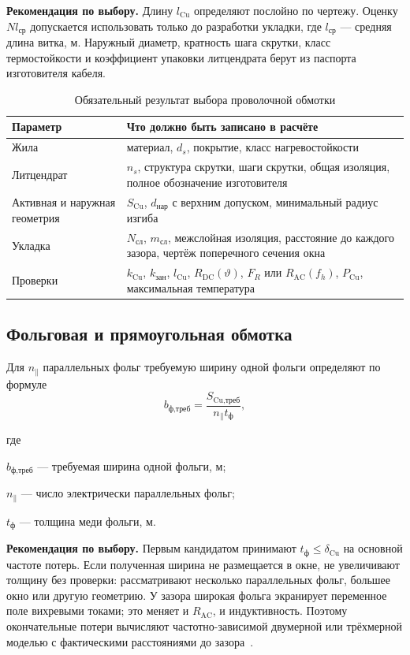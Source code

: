 \documentclass[14pt,a4paper]{extarticle}
\newcommand{\recommend}{\par\noindent\textbf{Рекомендация по выбору.} }
\newenvironment{whereblock}
 {\par\noindent где\par
  \begin{list}{}{\setlength{\leftmargin}{12.5mm}
                  \setlength{\itemindent}{-12.5mm}
                  \setlength{\itemsep}{0pt}
                  \setlength{\parsep}{0pt}
                  \setlength{\topsep}{0pt}}}
 {\end{list}}
\newcommand{\whereitem}[2]{\item[] #1 --- #2}
\begin{document}
\recommend Длину $l_{\text{Cu}}$ определяют послойно по чертежу.
Оценку $N l_{\text{ср}}$ допускается использовать только до разработки
укладки, где $l_{\text{ср}}$ --- средняя длина витка, м. Наружный диаметр,
кратность шага скрутки, класс термостойкости и коэффициент упаковки
литцендрата берут из паспорта изготовителя кабеля.

\begin{table}[H]
\caption{Обязательный результат выбора проволочной обмотки}
\label{tab:winding-selection-result}
\centering
\small
\begin{tabularx}{\textwidth}{>{\raggedright\arraybackslash}p{53mm} X}
\toprule
Параметр & Что должно быть записано в расчёте \\
\midrule
Жила & материал, $d_s$, покрытие, класс нагревостойкости \\
Литцендрат & $n_s$, структура скрутки, шаги скрутки, общая изоляция,
полное обозначение изготовителя \\
Активная и наружная геометрия & $S_{\text{Cu}}$, $d_{\text{нар}}$ с
верхним допуском, минимальный радиус изгиба \\
Укладка & $N_{\text{сл}}$, $m_{\text{сл}}$, межслойная изоляция, расстояние
до каждого зазора, чертёж поперечного сечения окна \\
Проверки & $k_{\text{Cu}}$, $k_{\text{зан}}$, $l_{\text{Cu}}$,
$R_{\text{DC}}(\vartheta)$, $F_R$ или $R_{\text{AC}}(f_h)$,
$P_{\text{Cu}}$, максимальная температура \\
\bottomrule
\end{tabularx}
\end{table}

\subsection{Фольговая и прямоугольная обмотка}

Для $n_{\parallel}$ параллельных фольг требуемую ширину одной фольги
определяют по формуле
\begin{equation}
 b_{\text{ф,треб}}=
 \frac{S_{\text{Cu,треб}}}
 {n_{\parallel}t_{\text{ф}}},
 \label{eq:foil-width}
\end{equation}
\begin{whereblock}
\whereitem{$b_{\text{ф,треб}}$}{требуемая ширина одной фольги, м;}
\whereitem{$n_{\parallel}$}{число электрически параллельных фольг;}
\whereitem{$t_{\text{ф}}$}{толщина меди фольги, м.}
\end{whereblock}

\recommend Первым кандидатом принимают
$t_{\text{ф}}\leq\delta_{\text{Cu}}$ на основной частоте потерь. Если
полученная ширина не размещается в окне, не увеличивают толщину без проверки:
рассматривают несколько параллельных фольг, большее окно или другую
геометрию. У зазора широкая фольга экранирует переменное поле вихревыми
токами; это меняет и $R_{\text{AC}}$, и индуктивность. Поэтому окончательные
потери вычисляют частотно-зависимой двумерной или трёхмерной моделью с
фактическими расстояниями до зазора~\cite{ewaldfoil}.
\end{document}
